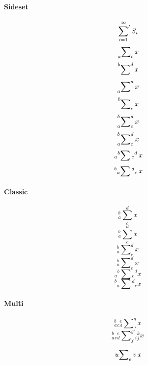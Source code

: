 \documentclass{article}
\begin{document}
\paragraph{Sideset}
\[ \sideset{}{'}\sum_{i=1}^\infty S_i \]
\[  \sideset{_a}{_c}{\sum} x\]
\[  \sideset{^b}{^d}{\sum} x\]
\[  \sideset{_a}{^d}{\sum} x\]
\[  \sideset{^b}{_c}{\sum} x\]
\[  \sideset{_a^b}{_c^d}{\sum} x\]
\[  \sideset{^b_a}{^d_c}{\sum} x\]
\[  \sideset{{}_a{}^b}{{}_c{}^d}{\sum} x\]
\[  \sideset{{}^b{}_a}{{}^d{}_c}{\sum} x\]

\paragraph{Classic}
\[  {}_a^b\sum_c^d x\]
\[  {}^b_a\sum^d_c x\]
\[  {}_a^b\sum\nolimits_c^d x\]
\[  {}^b_a\sum\nolimits^d_c x\]
\[  {}_a{}^b\sum{}_c{}^d x\]
\[  {}^b{}_a\sum{}^d{}_c x\]

\paragraph{Multi}

\[  {}_a^b{}_c{}_d^e\sum\nolimits_f^g x\]
\[  {}_a^b{}_c{}_d^e\sum\nolimits_f^g{}_i{}_j^k x\]

\[  \sideset{u}{_ev}{\sum} x\]
\end{document}
